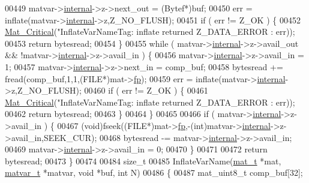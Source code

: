 \begin{DoxyCode}
{{{{{{{{{{{{00449     matvar->\hyperlink{group___m_a_t_a6e97e3ed9f40c49322c18561c2a94e92}{internal}->z->next\_out = (Bytef*)buf;
00450     err = inflate(matvar->\hyperlink{group___m_a_t_a6e97e3ed9f40c49322c18561c2a94e92}{internal}->z,Z\_NO\_FLUSH);
00451     \textcolor{keywordflow}{if} ( err != Z\_OK ) \{
00452         \hyperlink{group__mat__util_gaf51f2bfbb5580f575e4dd79757e2b80c}{Mat\_Critical}(\textcolor{stringliteral}{"InflateVarNameTag: inflate returned %
      Z\_DATA\_ERROR : err));
00453         \textcolor{keywordflow}{return} bytesread;
00454     \}
00455     \textcolor{keywordflow}{while} ( matvar->\hyperlink{group___m_a_t_a6e97e3ed9f40c49322c18561c2a94e92}{internal}->z->avail\_out && !matvar->\hyperlink{group___m_a_t_a6e97e3ed9f40c49322c18561c2a94e92}{internal}->z->avail\_in ) \{
00456         matvar->\hyperlink{group___m_a_t_a6e97e3ed9f40c49322c18561c2a94e92}{internal}->z->avail\_in = 1;
00457         matvar->\hyperlink{group___m_a_t_a6e97e3ed9f40c49322c18561c2a94e92}{internal}->z->next\_in = comp\_buf;
00458         bytesread += fread(comp\_buf,1,1,(FILE*)mat->\hyperlink{struct__mat__t_a85f562e407ca9ad4d2a6e14f839432b7}{fp});
00459         err = inflate(matvar->\hyperlink{group___m_a_t_a6e97e3ed9f40c49322c18561c2a94e92}{internal}->z,Z\_NO\_FLUSH);
00460         \textcolor{keywordflow}{if} ( err != Z\_OK ) \{
00461             \hyperlink{group__mat__util_gaf51f2bfbb5580f575e4dd79757e2b80c}{Mat\_Critical}(\textcolor{stringliteral}{"InflateVarNameTag: inflate returned %
      Z\_DATA\_ERROR : err));
00462             \textcolor{keywordflow}{return} bytesread;
00463         \}
00464     \}
00465 
00466     \textcolor{keywordflow}{if} ( matvar->\hyperlink{group___m_a_t_a6e97e3ed9f40c49322c18561c2a94e92}{internal}->z->avail\_in ) \{
00467         (void)fseek((FILE*)mat->\hyperlink{struct__mat__t_a85f562e407ca9ad4d2a6e14f839432b7}{fp},-(int)matvar->\hyperlink{group___m_a_t_a6e97e3ed9f40c49322c18561c2a94e92}{internal}->z->avail\_in,SEEK\_CUR);
00468         bytesread -= matvar->\hyperlink{group___m_a_t_a6e97e3ed9f40c49322c18561c2a94e92}{internal}->z->avail\_in;
00469         matvar->\hyperlink{group___m_a_t_a6e97e3ed9f40c49322c18561c2a94e92}{internal}->z->avail\_in = 0;
00470     \}
00471 
00472     \textcolor{keywordflow}{return} bytesread;
00473 \}
00474 
00484 \textcolor{keywordtype}{size\_t}
00485 InflateVarName(\hyperlink{struct__mat__t}{mat\_t} *mat, \hyperlink{group___m_a_t_structmatvar__t}{matvar\_t} *matvar, \textcolor{keywordtype}{void} *buf, \textcolor{keywordtype}{int} N)
00486 \{
00487     mat\_uint8\_t comp\_buf[32];
}}}}}}}}}}}}}}
\end{DoxyCode}
